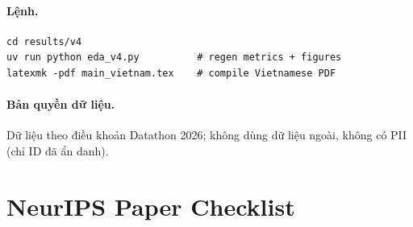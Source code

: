 \documentclass{article}
\begin{document}
\paragraph{Lệnh.}
\begin{verbatim}
cd results/v4
uv run python eda_v4.py          # regen metrics + figures
latexmk -pdf main_vietnam.tex    # compile Vietnamese PDF
\end{verbatim}

\paragraph{Bản quyền dữ liệu.} Dữ liệu theo điều khoản Datathon 2026; không dùng dữ liệu ngoài, không có PII (chỉ ID đã ẩn danh).

\newpage
\section*{NeurIPS Paper Checklist}
\end{document}
